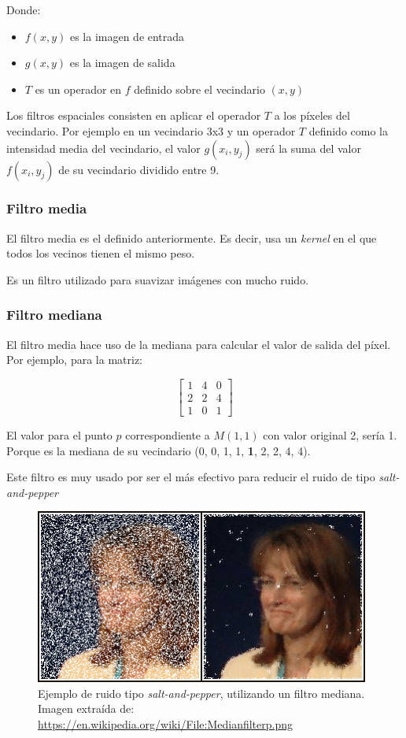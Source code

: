 Donde:

\begin{itemize}
	\item $f(x, y)$ es la imagen de entrada
	\item $g(x, y)$ es la imagen de salida
	\item $T$ es un operador en $f$ definido sobre el vecindario $(x,y)$
\end{itemize}

Los filtros espaciales consisten en aplicar el operador $T$ a los píxeles del vecindario. Por ejemplo en un vecindario 3x3 y un operador $T$ definido como la intensidad media del vecindario, el valor $g(x_{i}, y_{j})$ será la suma del valor $f(x_{i}, y_{j})$ de su vecindario dividido entre 9.

\subsubsection{Filtro media}

El filtro media es el definido anteriormente. Es decir, usa un \textit{kernel} en el que todos los vecinos tienen el mismo peso.

Es un filtro utilizado para suavizar imágenes con mucho ruido.

\subsubsection{Filtro mediana}

El filtro media hace uso de la mediana para calcular el valor de salida del píxel. Por ejemplo, para la matriz: 

\[
\begin{bmatrix}
	1 & 4 & 0 \\
	2 & 2 & 4 \\
	1 & 0 & 1 
\end{bmatrix} 
\]

El valor para el punto $p$ correspondiente a $M(1, 1)$ con valor original 2, sería 1. Porque es la mediana de su vecindario (0, 0, 1, 1, \textbf{1}, 2, 2, 4, 4).

Este filtro es muy usado por ser el más efectivo para reducir el ruido de tipo \textit{salt-and-pepper} 

\begin{figure}[H]
	\centering
	\includegraphics[width=11cm]{imagenes/desarrollo/salt-and-pepper}
	\caption{Ejemplo de ruido tipo \textit{salt-and-pepper}, utilizando un filtro mediana.  Imagen extraída de: \url{https://en.wikipedia.org/wiki/File:Medianfilterp.png}}
	\label{fig:desarrollo/salt-and-pepper}
\end{figure}

